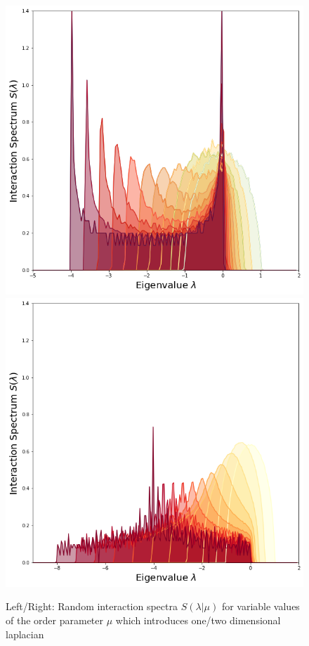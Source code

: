 \documentclass{article}[12pt]
\numberwithin{equation}{section}
\begin{document}
\begin{figure}[H]
\centering{}
\captionsetup{justification=centering}
\includegraphics[scale=0.3]{figures/interaction1d}
\includegraphics[scale=0.3]{figures/interaction2d}
\caption{Left/Right: Random interaction spectra $S(\lambda|\mu)$ for variable
values of the order parameter $\mu$ which introduces one/two dimensional laplacian}
\label{fig:spectrum}
\end{figure}



\end{document}
